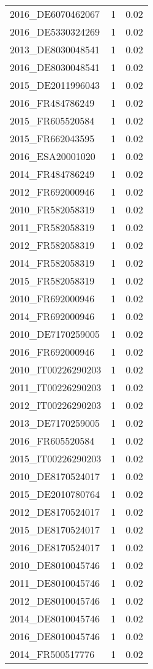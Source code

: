 \begin{table*}[htbp]
\begin{tabular}{lrr}
2016_DE6070462067 & 1 & 0.02 \\
2016_DE5330324269 & 1 & 0.02 \\
2013_DE8030048541 & 1 & 0.02 \\
2016_DE8030048541 & 1 & 0.02 \\
2015_DE2011996043 & 1 & 0.02 \\
2016_FR484786249 & 1 & 0.02 \\
2015_FR605520584 & 1 & 0.02 \\
2015_FR662043595 & 1 & 0.02 \\
2016_ESA20001020 & 1 & 0.02 \\
2014_FR484786249 & 1 & 0.02 \\
2012_FR692000946 & 1 & 0.02 \\
2010_FR582058319 & 1 & 0.02 \\
2011_FR582058319 & 1 & 0.02 \\
2012_FR582058319 & 1 & 0.02 \\
2014_FR582058319 & 1 & 0.02 \\
2015_FR582058319 & 1 & 0.02 \\
2010_FR692000946 & 1 & 0.02 \\
2014_FR692000946 & 1 & 0.02 \\
2010_DE7170259005 & 1 & 0.02 \\
2016_FR692000946 & 1 & 0.02 \\
2010_IT00226290203 & 1 & 0.02 \\
2011_IT00226290203 & 1 & 0.02 \\
2012_IT00226290203 & 1 & 0.02 \\
2013_DE7170259005 & 1 & 0.02 \\
2016_FR605520584 & 1 & 0.02 \\
2015_IT00226290203 & 1 & 0.02 \\
2010_DE8170524017 & 1 & 0.02 \\
2015_DE2010780764 & 1 & 0.02 \\
2012_DE8170524017 & 1 & 0.02 \\
2015_DE8170524017 & 1 & 0.02 \\
2016_DE8170524017 & 1 & 0.02 \\
2010_DE8010045746 & 1 & 0.02 \\
2011_DE8010045746 & 1 & 0.02 \\
2012_DE8010045746 & 1 & 0.02 \\
2014_DE8010045746 & 1 & 0.02 \\
2016_DE8010045746 & 1 & 0.02 \\
2014_FR500517776 & 1 & 0.02 \\

\end{tabular}
\end{table*}
